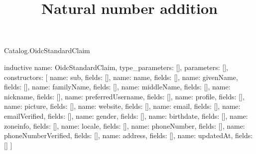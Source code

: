 \begin{lexlean}{Catalog.OidcStandardClaim}
\title{Natural number addition}
\begin{semanticmodule}
inductive{
  name: OidcStandardClaim,
  type_parameters: [],
  parameters: [],
  constructors: [
    {name: sub, fields: []},
    {name: name, fields: []},
    {name: givenName, fields: []},
    {name: familyName, fields: []},
    {name: middleName, fields: []},
    {name: nickname, fields: []},
    {name: preferredUsername, fields: []},
    {name: profile, fields: []},
    {name: picture, fields: []},
    {name: website, fields: []},
    {name: email, fields: []},
    {name: emailVerified, fields: []},
    {name: gender, fields: []},
    {name: birthdate, fields: []},
    {name: zoneinfo, fields: []},
    {name: locale, fields: []},
    {name: phoneNumber, fields: []},
    {name: phoneNumberVerified, fields: []},
    {name: address, fields: []},
    {name: updatedAt, fields: []}
  ]
}
\end{semanticmodule}
\end{lexlean}
